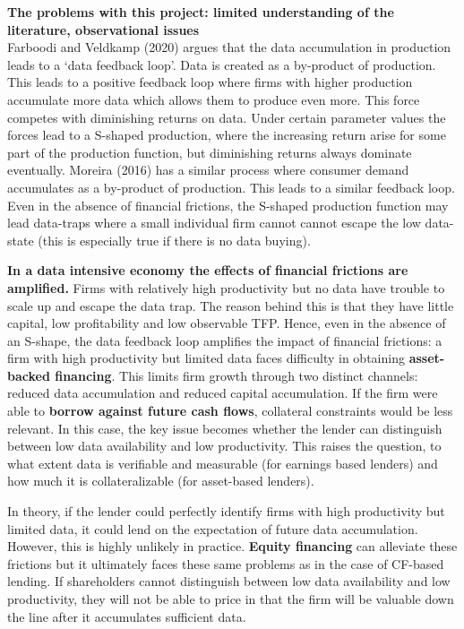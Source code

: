 \documentclass[12pt]{article}
\begin{document}
\textbf{The problems with this project: limited understanding of the literature, observational issues} \vspace{3mm} \\
Farboodi and Veldkamp (2020) argues that the data accumulation in production leads to a `data feedback loop'. Data is created as a by-product of production. This leads to a positive feedback loop where firms with higher production accumulate more data which allows them to produce even more. This force competes with diminishing returns on data. Under certain parameter values the forces lead to a S-shaped production, where the increasing return arise for some part of the production function, but diminishing returns always dominate eventually. Moreira (2016) has a similar process where consumer demand accumulates as a by-product of production. This leads to a similar feedback loop. Even in the absence of financial frictions, the S-shaped production function may lead data-traps where a small individual firm cannot cannot escape the low data-state (this is especially true if there is no data buying). 

\textbf{In a data intensive economy the effects of financial frictions are amplified.} Firms with relatively high productivity but no data have trouble to scale up and escape the data trap. The reason behind this is that they have little capital, low profitability and low observable TFP. Hence, even in the absence of an S-shape, the data feedback loop amplifies the impact of financial frictions: a firm with high productivity but limited data faces difficulty in obtaining \textbf{asset-backed financing}. This limits firm growth through two distinct channels: reduced data accumulation and reduced capital accumulation. If the firm were able to \textbf{borrow against future cash flows}, collateral constraints would be less relevant. In this case, the key issue becomes whether the lender can distinguish between low data availability and low productivity. This raises the question, to what extent data is verifiable and measurable (for earnings based lenders) and how much it is collateralizable (for asset-based lenders). 

In theory, if the lender could perfectly identify firms with high productivity but limited data, it could lend on the expectation of future data accumulation. However, this is highly unlikely in practice. \textbf{Equity financing} can alleviate these frictions but it ultimately faces these same problems as in the case of CF-based lending. If shareholders cannot distinguish between low data availability and low productivity, they will not be able to price in that the firm will be valuable down the line after it accumulates sufficient data.  
\end{document}
